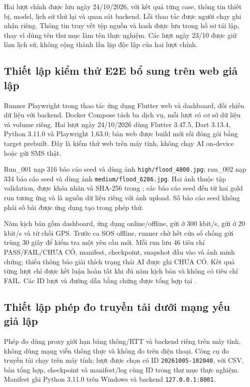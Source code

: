 Hai lượt chính được lưu ngày 24/10/2026, với kết quả từng case, thông tin thiết bị, model, lịch sử thử lại và quan sát backend. Lỗi thao tác được người chạy ghi nhận riêng. Thông tin truy vết tệp nguồn và hash được lưu trong hồ sơ tái lập, thay vì dùng tên thư mục làm tên thực nghiệm. Các lượt ngày 23/10 được giữ làm lịch sử, không cộng thành lần lặp độc lập của hai lượt chính.

\subsection{Thiết lập kiểm thử E2E bổ sung trên web giả lập}\label{sec:web-e2e-setup}
Runner Playwright trong  thao tác ứng dụng Flutter web và dashboard, đối chiếu dữ liệu với backend. Docker Compose tách ba dịch vụ, mỗi lượt có cơ sở dữ liệu và volume riêng. Hai lượt ngày 24/10/2026 dùng Flutter 3.47.5, Dart 3.13.4, Python 3.11.0 và Playwright 1.63.0; bản web được build mới rồi đóng gói bằng target prebuilt. Đây là kiểm thử web trên máy tính, không chạy AI on-device hoặc gửi SMS thật.

Run\_001 nạp 316 báo cáo seed và dùng ảnh \texttt{high/flood\_4800.jpg}; run\_002 nạp 334 báo cáo seed và dùng ảnh \texttt{medium/flood\_6286.jpg}. Hai ảnh thuộc tập validation, được khóa nhãn và SHA-256 trong ; các báo cáo seed đến từ hai gold run tương ứng và là nguồn dữ liệu riêng với ảnh upload. Số báo cáo seed không phải số bài được ứng dụng tạo trong phép thử.

Năm kịch bản gồm dashboard, ứng dụng online/offline, gửi ở 300 kbit/s, gửi ở 20 kbit/s và từ chối GPS. Trước ca SOS offline, runner chờ hết cửa sổ chống gửi trùng 30 giây để kiểm tra một yêu cầu mới. Mỗi run lưu 46 tiêu chí PASS/FAIL/CHƯA CÓ, manifest, checkpoint, snapshot đầu vào và ảnh minh chứng; thiếu thông báo giải thích trạng thái AI được ghi CHƯA CÓ. Kết quả từng lượt chỉ được kết luận hoàn tất khi đủ năm kịch bản và không có tiêu chí FAIL. Các ID lượt và đường dẫn bằng chứng được tổng hợp tại .

\subsection{Thiết lập phép đo truyền tải dưới mạng yếu giả lập}\label{sec:weak-network-setup}
Phép đo dùng proxy giới hạn băng thông/RTT và backend riêng trên máy tính, không dùng mạng viễn thông thực và không đo trên điện thoại. Công cụ đo truyền tải chạy trên máy tính; lượt được chọn có ID \texttt{20261005-102040}, với CSV, bản tổng hợp, checkpoint và manifest/log cùng ID trong thư mục thực nghiệm. Manifest ghi Python 3.11.0 trên Windows và backend \texttt{127.0.0.1:8001}.

